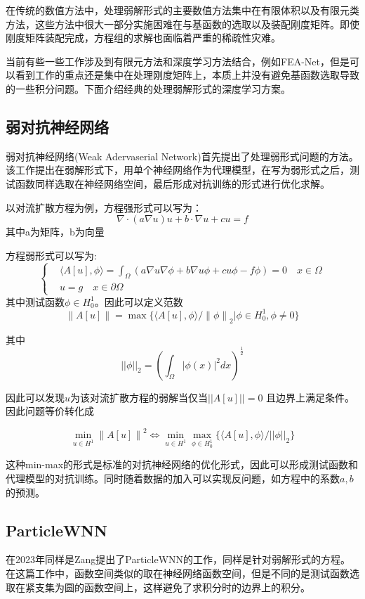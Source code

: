 在传统的数值方法中，处理弱解形式的主要数值方法集中在有限体积以及有限元类方法，这些方法中很大一部分实施困难在与基函数的选取以及装配刚度矩阵。即使刚度矩阵装配完成，方程组的求解也面临着严重的稀疏性灾难。

当前有些一些工作涉及到有限元方法和深度学习方法结合，例如FEA-Net\cite{YAO2020112892}，但是可以看到工作的重点还是集中在处理刚度矩阵上，本质上并没有避免基函数选取导致的一些积分问题。下面介绍经典的处理弱解形式的深度学习方案。

\subsection{弱对抗神经网络}
弱对抗神经网络(Weak Adervaserial Network)首先提出了处理弱形式问题的方法。该工作提出在弱解形式下，用单个神经网络作为代理模型，在写为弱形式之后，测试函数同样选取在神经网络空间，最后形成对抗训练的形式进行优化求解。

以对流扩散方程为例，方程强形式可以写为：
$$\nabla\cdot(a\nabla u) u + b\cdot\nabla u + cu=f$$
其中a为矩阵，b为向量

方程弱形式可以写为:
$$\left\{
\begin{aligned}
    &\langle A[u], \phi\rangle=\int_\Omega (a\nabla u\nabla \phi +b\nabla u \phi + cu\phi - f\phi) = 0\quad x\in \Omega\\
    &u=g\quad x\in \partial \Omega
\end{aligned}\right.$$
其中测试函数$\phi \in H^1_0$。因此可以定义范数
$$\left\lVert A[u] \right\rVert =\max\{\langle A[u],\phi \rangle/\left\lVert \phi\right\rVert _2|\phi\in H^1_0, \phi \neq 0\}$$

其中$$||\phi||_2=\left(\int_\Omega |\phi(x)|^2dx\right)^{\frac{1}{2}}$$

因此可以发现$u$为该对流扩散方程的弱解当仅当$||A[u]||=0$ 且边界上满足条件。因此问题等价转化成
\begin{tcolorbox}
    $$\min_{u\in H^1}\left\lVert A[u]\right\rVert ^2 \Leftrightarrow \min_{u\in H^1}\max_{\phi\in H^1_0}\{\langle A[u],\phi \rangle/||\phi||_2\}$$
\end{tcolorbox}


这种min-max的形式是标准的对抗神经网络的优化形式，因此可以形成测试函数和代理模型的对抗训练。同时随着数据的加入可以实现反问题，如方程中的系数$a,b$的预测。

\subsection{ParticleWNN}
在2023年同样是Zang提出了ParticleWNN的工作\cite{zang2023particlewnn}，同样是针对弱解形式的方程。在这篇工作中，函数空间类似的取在神经网络函数空间，但是不同的是测试函数选取在紧支集为圆的函数空间上，这样避免了求积分时的边界上的积分。

